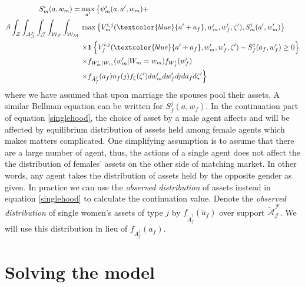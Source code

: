 \begin{align}
S_m^i(a, w_m) = & \max_{a'} \left \{ \psi^i_m(a, a', w_m) + \right.  \nonumber \\
\left.  \beta  \int_{\mathcal{Z}} \int_{\mathcal{A_J^F}} \int_{\mathcal J} \int_{\mathcal{W_F}} \int_{\mathcal{W_M}} \right. & \left. \max  \left \{V_m^{i,j}(\textcolor{blue}{a'+ a_f}, w'_m, w'_f, \zeta'), S_m^i(a', w'_m) \right \}  \right. \nonumber \label{singlehood} \\
&\left.  \times \mathbf 1\left \{V_f^{i,j}(\textcolor{blue}{a'+ a_f}, w'_m, w'_f, \zeta') - S_f^j( a_f, w'_f) \geq 0 \right \} \right. \\
&\left. \times f_{W'_m|W_m} (w'_m| W_m = w_m) f_{W'_f} (w'_f) \right.  \nonumber \\
&\left. \times f_{\tilde A_f^j}( a _f) n_f(j) f_{\zeta}(\zeta') dw'_m dw'_f  dj da_f d\zeta' \right\} \nonumber 
\end{align}
where we have assumed that upon marriage the spouses pool their assets. A similar Bellman equation can be written for $S_f^j(a, w_f)$. In the continuation part of equation \eqref{singlehood}, the choice of asset by a male agent affects and will be affected by equilibrium distribution of assets held among female agents which makes matters complicated. One simplifying assumption is to assume that there are a large number of agent, thus, the actions of a single agent does not affect the the distribution of females' assets on the other side of matching market. In other words, any agent takes the distribution of assets held by the opposite gender as given. In practice we can use the \emph{observed distribution} of assets instead in equation \eqref{singlehood} to calculate the continuation value. 
Denote the \emph{observed distribution} of single women's assets of type $j$ by $f_{\tilde A_f^j}(\tilde a _f)$ over support $\mathcal{\tilde{A}_J^F}$. We will use this distribution in lieu of $f_{A_f^j}( a _f)$. 

\section{Solving the model}

